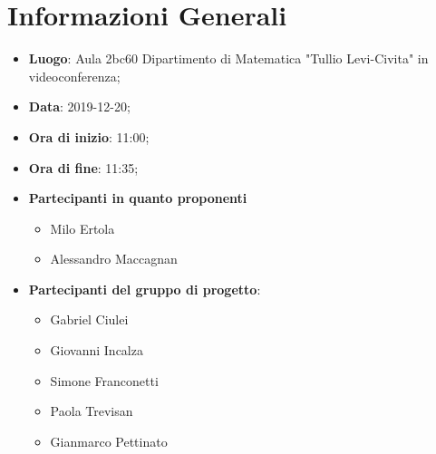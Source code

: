 \section{Informazioni Generali}
	\begin{itemize}
		\item \textbf {Luogo}: Aula 2bc60 Dipartimento di Matematica "Tullio Levi-Civita" in videoconferenza;
		\item \textbf {Data}: 2019-12-20;
		\item \textbf {Ora di inizio}: 11:00;
		\item \textbf {Ora di fine}: 11:35;
		\item \textbf {Partecipanti in quanto proponenti}
		  \begin{itemize}
		    \item Milo Ertola
		    \item Alessandro Maccagnan
		  \end{itemize}
		\item \textbf {Partecipanti del gruppo di progetto}:
			\begin{itemize}
				\item Gabriel Ciulei
				\item Giovanni Incalza
				\item Simone Franconetti
				\item Paola Trevisan
				\item Gianmarco Pettinato
			\end{itemize}
	\end{itemize}
